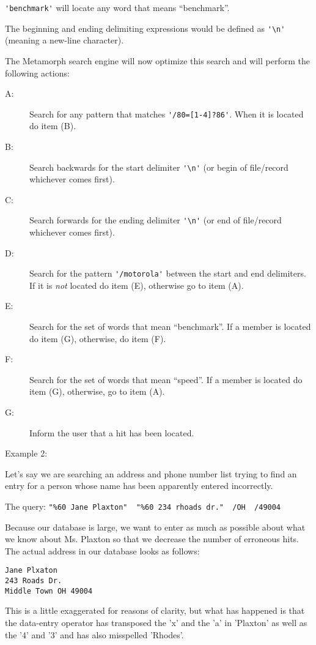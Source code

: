 \verb`'benchmark'`  will locate any word that means ``benchmark''.

The beginning and ending delimiting expressions would be defined
as \verb`'\n'` (meaning a new-line character).

The Metamorph search engine will now optimize this search and will
perform the following actions:

\begin{description}
\item [A:]  Search for any pattern that matches \verb`'/80=[1-4]?86'`.
When it is located do item (B).
\item [B:]  Search backwards for the start delimiter \verb`'\n'` (or begin of
file/record whichever comes first).
\item [C:]  Search forwards for the ending delimiter \verb`'\n'` (or end of
file/record whichever comes first).
\item [D:]  Search for the pattern \verb`'/motorola'` between the start and end
delimiters.  If it is {\em not} located do item (E), otherwise go
to item (A).
\item [E:]  Search for the set of words that mean ``benchmark''.  If a
member is located do item (G), otherwise, do item (F).
\item [F:]  Search for the set of words that mean ``speed''.  If a
member is located do item (G), otherwise, go to item (A).
\item [G:]  Inform the user that a hit has been located.
\end{description}

Example 2:

Let's say we are searching an address and phone number list trying
to find an entry for a person whose name has been apparently
entered incorrectly.

The query: \verb`"%60 Jane Plaxton"  "%60 234 rhoads dr."  /OH  /49004`

Because our database is large, we want to enter as much as
possible about what we know about Ms. Plaxton so that we decrease
the number of erroneous hits.  The actual address in our database
looks as follows:

\begin{verbatim}
Jane Plxaton
243 Roads Dr.
Middle Town OH 49004
\end{verbatim}

This is a little exaggerated for reasons of clarity, but what has
happened is that the data-entry operator has transposed the 'x'
and the 'a' in 'Plaxton' as well as the '4' and '3' and has also
misspelled 'Rhodes'.

